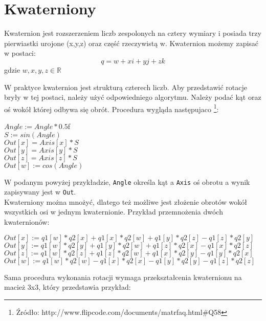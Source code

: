 \section{Kwaterniony}
Kwaternion jest rozszerzeniem liczb zespolonych na cztery wymiary i posiada trzy pierwiastki urojone (x,y,z) oraz część rzeczywistą w. Kwaternion możemy zapisać w postaci:\\
\begin{equation}q = w + xi +yj +zk\end{equation}
gdzie  $w,x,y,z \in \mathbb{R}$

W praktyce kwaternion jest strukturą czterech liczb. Aby przedstawić rotacje bryły w tej postaci, należy użyć odpowiedniego algorytmu. Należy podać kąt oraz oś wokół której odbywa się obrót. Procedura wygląda następujaco \footnote{Źródło: http://www.flipcode.com/documents/matrfaq.html\#Q58}: \\
\begin{centering}
$Angle := Angle*0.5$f\\
$S := sin(Angle)$\\
$Out[x] = Axis[x] * S$ \\
$Out[y] = Axis[y] * S$ \\
$Out[z] = Axis[z] * S$ \\
$Out[w] := cos(Angle)$\\
\end{centering}
W podanym powyżej przykładzie, \verb$Angle$ określa kąt a \verb$Axis$ oś obrotu a wynik zapisywany jest w \verb$Out$.\\
Kwaterniony można mnożyć, dlatego też możliwe jest złożenie obrotów wokół wszystkich osi w jednym kwaternionie. Przykład przemnożenia dwóch kwaternionów: \\
\begin{centering}
$Out[x] := q1[w]*q2[x] + q1[x]*q2[w] + q1[y]*q2[z] - q1[z]*q2[y]$\\
$Out[y] := q1[w]*q2[y] + q1[y]*q2[w] + q1[z]*q2[x] - q1[x]*q2[z]$\\
$Out[z] := q1[w]*q2[z] + q1[z]*q2[w] + q1[x]*q2[y] - q1[y]*q2[x]$\\
$Out[w] := q1[w]*q2[w] - q1[x]*q2[x] - q1[y]*q2[y] - q1[z]*q2[z]$\\
\end{centering}
Sama procedura wykonania rotacji wymaga przekształcenia kwaternionu na macież 3x3, który przedstawia przykład:\\
